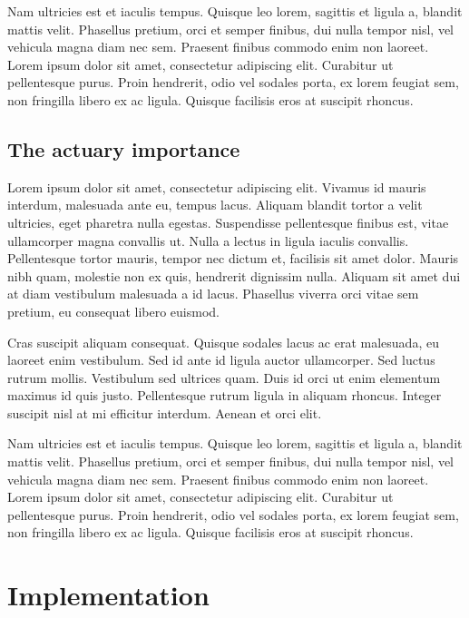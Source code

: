 \documentclass[a4paper, nobind]{templates/ociamthesis}
\theoremstyle{definition}
\theoremstyle{definition}
\theoremstyle{definition}
\theoremstyle{remark}
\begin{document}
Nam ultricies est et iaculis tempus. Quisque leo lorem, sagittis et ligula a, blandit mattis velit. Phasellus pretium, orci et semper finibus, dui nulla tempor nisl, vel vehicula magna diam nec sem. Praesent finibus commodo enim non laoreet. Lorem ipsum dolor sit amet, consectetur adipiscing elit. Curabitur ut pellentesque purus. Proin hendrerit, odio vel sodales porta, ex lorem feugiat sem, non fringilla libero ex ac ligula. Quisque facilisis eros at suscipit rhoncus.

\hypertarget{chap:actuary-importance}{%
\subsection{The actuary importance}\label{chap:actuary-importance}}

Lorem ipsum dolor sit amet, consectetur adipiscing elit. Vivamus id mauris interdum, malesuada ante eu, tempus lacus. Aliquam blandit tortor a velit ultricies, eget pharetra nulla egestas. Suspendisse pellentesque finibus est, vitae ullamcorper magna convallis ut. Nulla a lectus in ligula iaculis convallis. Pellentesque tortor mauris, tempor nec dictum et, facilisis sit amet dolor. Mauris nibh quam, molestie non ex quis, hendrerit dignissim nulla. Aliquam sit amet dui at diam vestibulum malesuada a id lacus. Phasellus viverra orci vitae sem pretium, eu consequat libero euismod.

Cras suscipit aliquam consequat. Quisque sodales lacus ac erat malesuada, eu laoreet enim vestibulum. Sed id ante id ligula auctor ullamcorper. Sed luctus rutrum mollis. Vestibulum sed ultrices quam. Duis id orci ut enim elementum maximus id quis justo. Pellentesque rutrum ligula in aliquam rhoncus. Integer suscipit nisl at mi efficitur interdum. Aenean et orci elit.

Nam ultricies est et iaculis tempus. Quisque leo lorem, sagittis et ligula a, blandit mattis velit. Phasellus pretium, orci et semper finibus, dui nulla tempor nisl, vel vehicula magna diam nec sem. Praesent finibus commodo enim non laoreet. Lorem ipsum dolor sit amet, consectetur adipiscing elit. Curabitur ut pellentesque purus. Proin hendrerit, odio vel sodales porta, ex lorem feugiat sem, non fringilla libero ex ac ligula. Quisque facilisis eros at suscipit rhoncus.

\hypertarget{chap:implementation}{%
\section{Implementation}\label{chap:implementation}}
\end{document}
